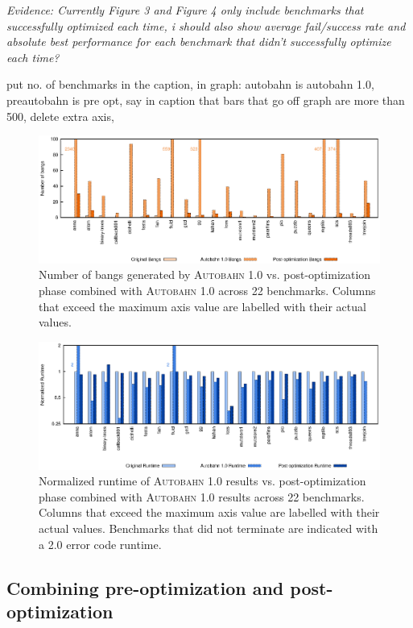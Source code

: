 \documentclass[format=sigplan]{acmart}
\newcommand{\Ao}[0]{\textsc{Autobahn 1.0}}
\newcommand{\preopt}[0]{pre-optimization}
\newcommand{\postopt}[0]{post-optimization}
\begin{document}
\textit{Evidence: Currently Figure 3 and Figure 4 only include benchmarks that successfully optimized each time, i should also show average fail/success rate and absolute best performance for each benchmark that didn't successfully optimize each time?}

put no. of benchmarks in the caption, in graph: autobahn is autobahn 1.0, preautobahn is pre opt, say in caption that bars that go off graph are more than 500, delete extra axis, 

\begin{figure}
\includegraphics[width=\textwidth]{aut-post-bangs}
\caption{Number of bangs generated by \Ao{} vs. \postopt{} phase combined with \Ao{} across 22 benchmarks. Columns that exceed the maximum axis value are labelled with their actual values.}
\end{figure}

\begin{figure}
\includegraphics[width=\textwidth]{aut-post}
\caption{Normalized runtime of \Ao{} results vs. \postopt{} phase combined with \Ao{} results across 22 benchmarks. Columns that exceed the maximum axis value are labelled with their actual values. Benchmarks that did not terminate are indicated with a 2.0 error code runtime.}
\end{figure}

\subsection{Combining \preopt{} and \postopt{}}
\end{document}
